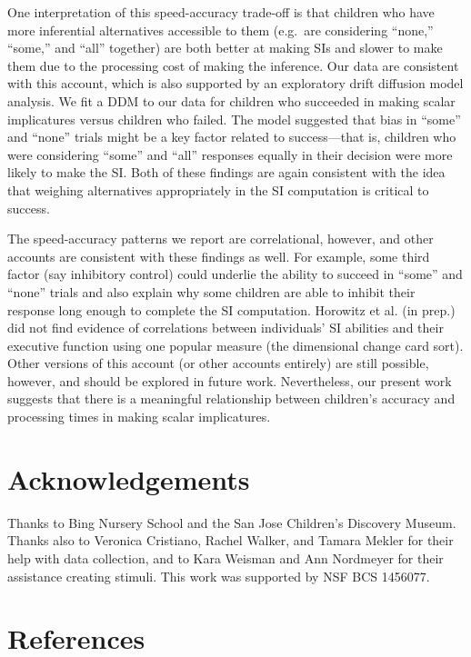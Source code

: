 \documentclass[10pt, letterpaper]{article}
\begin{document}
One interpretation of this speed-accuracy trade-off is that children who
have more inferential alternatives accessible to them (e.g.~are
considering ``none,'' ``some,'' and ``all'' together) are both better at
making SIs and slower to make them due to the processing cost of making
the inference. Our data are consistent with this account, which is also
supported by an exploratory drift diffusion model analysis. We fit a DDM
to our data for children who succeeded in making scalar implicatures
versus children who failed. The model suggested that bias in ``some''
and ``none'' trials might be a key factor related to success---that is,
children who were considering ``some'' and ``all'' responses equally in
their decision were more likely to make the SI. Both of these findings
are again consistent with the idea that weighing alternatives
appropriately in the SI computation is critical to success.

The speed-accuracy patterns we report are correlational, however, and
other accounts are consistent with these findings as well. For example,
some third factor (say inhibitory control) could underlie the ability to
succeed in ``some'' and ``none'' trials and also explain why some
children are able to inhibit their response long enough to complete the
SI computation. Horowitz et al. (in prep.) did not find evidence of
correlations between individuals' SI abilities and their executive
function using one popular measure (the dimensional change card sort).
Other versions of this account (or other accounts entirely) are still
possible, however, and should be explored in future work. Nevertheless,
our present work suggests that there is a meaningful relationship
between children's accuracy and processing times in making scalar
implicatures.

\section{Acknowledgements}\label{acknowledgements}

Thanks to Bing Nursery School and the San Jose Children's Discovery
Museum. Thanks also to Veronica Cristiano, Rachel Walker, and Tamara
Mekler for their help with data collection, and to Kara Weisman and Ann
Nordmeyer for their assistance creating stimuli. This work was supported
by NSF BCS 1456077.

\section{References}\label{references}
\end{document}
